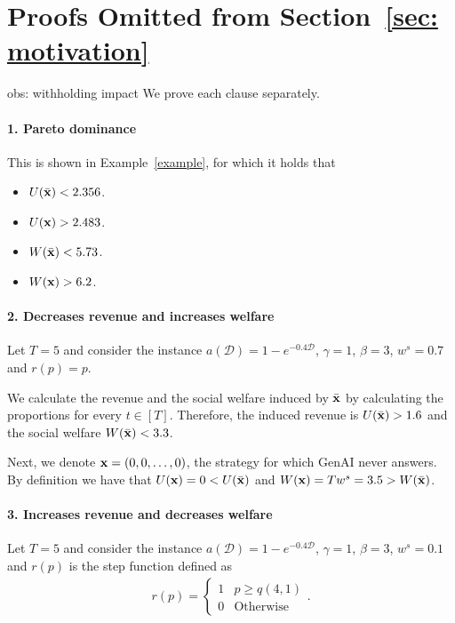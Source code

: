 \section{Proofs Omitted from Section~\ref{sec: motivation}}

\begin{proofof}{obs: withholding impact}
We prove each clause separately.

\paragraph{1. Pareto dominance} This is shown in Example~\ref{example}, for which it holds that
\begin{itemize}
    \item $U(\Bar{{\bf{x}}}) < 2.356$.
    \item $U({\bf{x}}) > 2.483$.
    \item $W(\Bar{{\bf{x}}}) < 5.73$.
    \item $W({\bf{x}}) > 6.2$.
\end{itemize}


\paragraph{2. Decreases revenue and increases welfare} 
Let $T = 5$ and consider the instance $a(\mathcal{D}) = 1-e^{-0.4 \mathcal{D}}$, $\gamma = 1$, $\beta = 3$, $w^s = 0.7$ and $r(p) = p$.

We calculate the revenue and the social welfare induced by $\Bar{{\bf{x}}}$ by calculating the proportions for every $t \in [T]$. Therefore, the induced revenue is $U(\Bar{{\bf{x}}}) > 1.6$ and the social welfare $W(\Bar{{\bf{x}}}) < 3.3$.

Next, we denote ${\bf{x}} = (0, 0, \ldots, 0)$, the strategy for which GenAI never answers. By definition we have that $U({\bf{x}}) = 0 < U(\Bar{{\bf{x}}})$ and $W({\bf{x}}) = T w^s = 3.5 > W(\Bar{{\bf{x}}})$.


\paragraph{3. Increases revenue and decreases welfare} 
Let $T = 5$ and consider the instance $a(\mathcal{D}) = 1-e^{-0.4 \mathcal{D}}$, $\gamma = 1$, $\beta = 3$, $w^s = 0.1$ and $r(p)$ is the step function defined as
\begin{align*}
r(p) = \begin{cases}
    1 & \mbox{$p \geq q(4, 1)$} \\
    0 & \mbox{Otherwise}
\end{cases}.
\end{align*}


\end{proofof}

